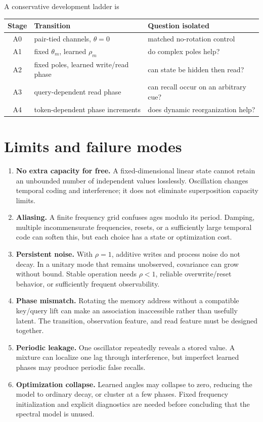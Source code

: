 \documentclass[11pt]{article}
\begin{document}
A conservative development ladder is
\begin{center}
\begin{tabular}{cll}
\toprule
Stage & Transition & Question isolated \\
\midrule
A0 & pair-tied channels, $\theta=0$ & matched no-rotation control \\
A1 & fixed $\theta_m$, learned $\rho_m$ & do complex poles help? \\
A2 & fixed poles, learned write/read phase & can state be hidden then read? \\
A3 & query-dependent read phase & can recall occur on an arbitrary cue? \\
A4 & token-dependent phase increments & does dynamic reorganization help? \\
\bottomrule
\end{tabular}
\end{center}


\section{Limits and failure modes}

\begin{enumerate}[leftmargin=1.7em,itemsep=4pt]
  \item \textbf{No extra capacity for free.} A fixed-dimensional linear state cannot retain an
  unbounded number of independent values losslessly. Oscillation changes temporal coding and
  interference; it does not eliminate superposition capacity limits.

  \item \textbf{Aliasing.} A finite frequency grid confuses ages modulo its period. Damping,
  multiple incommensurate frequencies, resets, or a sufficiently large temporal code can
  soften this, but each choice has a state or optimization cost.

  \item \textbf{Persistent noise.} With $\rho=1$, additive writes and process noise do not
  decay. In a unitary mode that remains unobserved, covariance can grow without bound. Stable
  operation needs $\rho<1$, reliable overwrite/reset behavior, or sufficiently frequent
  observability.

  \item \textbf{Phase mismatch.} Rotating the memory address without a compatible key/query
  lift can make an association inaccessible rather than usefully latent. The transition,
  observation feature, and read feature must be designed together.

  \item \textbf{Periodic leakage.} One oscillator repeatedly reveals a stored value. A mixture
  can localize one lag through interference, but imperfect learned phases may produce periodic
  false recalls.

  \item \textbf{Optimization collapse.} Learned angles may collapse to zero, reducing the
  model to ordinary decay, or cluster at a few phases. Fixed frequency initialization and
  explicit diagnostics are needed before concluding that the spectral model is unused.
\end{enumerate}
\end{document}
